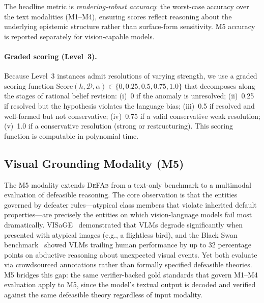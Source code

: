\documentclass{article}
\theoremstyle{definition}
\newcommand{\D}{\mathcal{D}}
\begin{document}
The headline metric is \textit{rendering-robust accuracy}: the worst-case accuracy over the text modalities (M1--M4), ensuring scores reflect reasoning about the underlying epistemic structure rather than surface-form sensitivity. M5 accuracy is reported separately for vision-capable models.

\paragraph{Graded scoring (Level~3).}\label{subsec:scoring}
Because Level~3 instances admit resolutions of varying strength, we use a graded scoring function $\mathrm{Score}(h, \D, \alpha) \in \{0, 0.25, 0.5, 0.75, 1.0\}$ that decomposes along the stages of rational belief revision: (i)~0 if the anomaly is unresolved; (ii)~0.25 if resolved but the hypothesis violates the language bias; (iii)~0.5 if resolved and well-formed but not conservative; (iv)~0.75 if a valid conservative weak resolution; (v)~1.0 if a conservative resolution (strong or restructuring). This scoring function is computable in polynomial time.


\subsection{Visual Grounding Modality (M5)}\label{subsec:m5}

The M5 modality extends \textsc{DeFAb} from a text-only benchmark to a multimodal evaluation of defeasible reasoning. The core observation is that the entities governed by defeater rules---atypical class members that violate inherited default properties---are precisely the entities on which vision-language models fail most dramatically. VISaGE~\cite{park2025visage} demonstrated that VLMs degrade significantly when presented with atypical images (e.g., a flightless bird), and the Black Swan benchmark~\cite{chinchure2025blackswan} showed VLMs trailing human performance by up to 32 percentage points on abductive reasoning about unexpected visual events. Yet both evaluate via crowdsourced annotations rather than formally specified defeasible theories. M5 bridges this gap: the same verifier-backed gold standards that govern M1--M4 evaluation apply to M5, since the model's textual output is decoded and verified against the same defeasible theory regardless of input modality.
\end{document}
